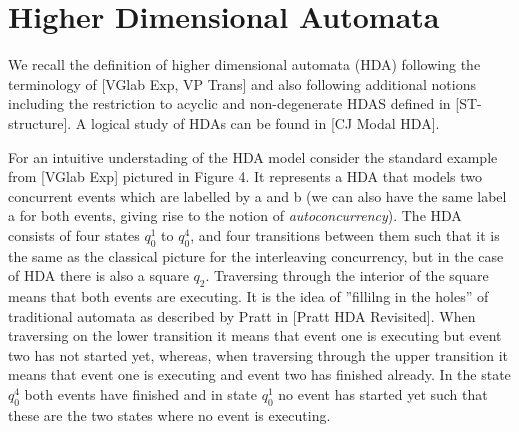 \documentclass[submission,copyright,creativecommons]{eptcs}
\begin{document}

\section{Higher Dimensional Automata}
	We recall the definition of higher dimensional automata (HDA) following the terminology of [VGlab Exp, VP Trans] and also following additional notions including the restriction to acyclic and non-degenerate HDAS defined in [ST-structure]. A logical study of HDAs can be found in [CJ Modal HDA].


	For an intuitive understading of the HDA model consider the standard example from [VGlab Exp] pictured in Figure 4. It represents a HDA that models two concurrent events which are labelled by a and b (we can also have the same label a for both events, giving rise to the notion of \emph{autoconcurrency}). The HDA consists of four states $q_{0}^{1}$ to $q_{0}^{4}$, and four transitions between them such that it is the same as the classical picture for the interleaving concurrency, but in the case of HDA there is also a square $q_{2}$. Traversing through the interior of the square means that both events are executing. It is the idea of ''fillilng in the holes'' of traditional automata as described by Pratt in [Pratt HDA Revisited]. When traversing on the lower transition it means that event one is executing but event two has not started yet, whereas, when traversing through the upper transition it means that event one is executing and event two has finished already. In the state $q_{0}^{4}$ both events have finished and in state $q_{0}^{1}$ no event has started yet such that these are the two states where no event is executing.
\end{document}
